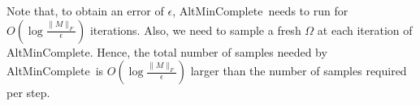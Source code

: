 \documentclass[11pt]{article}
\renewcommand{\eqref}[1]{\hyperref[#1]{(\ref*{#1})}}
\theoremstyle{plain}
\newtheorem{lemma}[theorem]{Lemma}
\theoremstyle{definition}
\newcommand{\dist}{\mathrm{dist}}
\newcommand{\vto}{v^{t+1}}
\newcommand{\ut}{u^t}
\newcommand{\uo}{u^* }
\newcommand{\vo}{v^* }
\newcommand{\wvto}{\widehat{v}^{t+1}}
\newcommand{\ip}[2]{\langle #1, #2 \rangle}
\newcommand{\vt}{\vto}
\newcommand{\vht}{\wvto}
\newcommand{\amc}{AltMinComplete\ }
\newcommand{\amce}{AltMinComplete}
\begin{document}
Note that, to obtain an error of $\epsilon$, \amc needs to run for $O\left(\log \frac{\|M\|_F}{\epsilon}\right)$ iterations. Also, we need to sample a fresh $\Omega$ at each iteration of \amce. Hence, the total number of samples needed by \amc is $O\left(\log \frac{\|M\|_F}{\epsilon}\right)$ larger than the  number of samples required per step.
\end{document}
